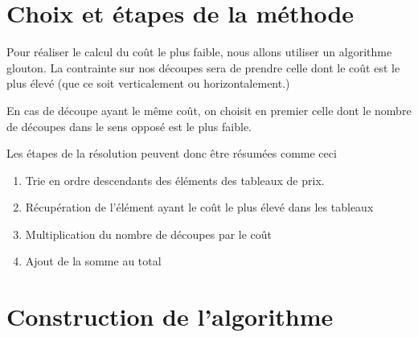 \documentclass[11pt]{article}
\begin{document}
\section{Choix et étapes de la méthode}

Pour réaliser le calcul du coût le plus faible, nous allons utiliser un algorithme glouton. La contrainte sur nos découpes sera de prendre celle dont le coût est le plus élevé (que ce soit verticalement ou horizontalement.)

En cas de découpe ayant le même coût, on choisit en premier celle dont le nombre de découpes dans le sens opposé est le plus faible.

Les étapes de la résolution peuvent donc être résumées comme ceci

\begin{enumerate}
	\item Trie en ordre descendants des éléments des tableaux de prix.
	\item Récupération de l'élément ayant le coût le plus élevé dans les tableaux
	\item Multiplication du nombre de découpes par le coût
	\item Ajout de la somme au total 
\end{enumerate}

\section{Construction de l'algorithme}
\end{document}
